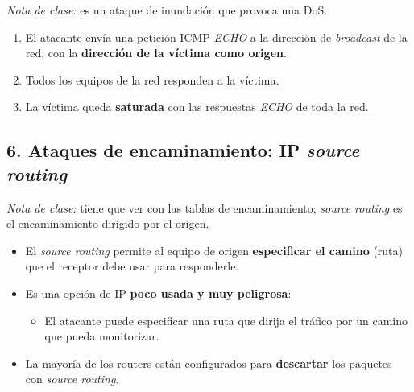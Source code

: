 \documentclass[11pt,a4paper]{report}
\begin{document}
\noindent\emph{Nota de clase:} es un ataque de inundación que provoca una DoS.
 
\begin{center}
\end{center}
 
\begin{enumerate}
  \item El atacante envía una petición ICMP \emph{ECHO} a la dirección de \emph{broadcast} de la red, con la \textbf{dirección de la víctima como origen}.
  \item Todos los equipos de la red responden a la víctima.
  \item La víctima queda \textbf{saturada} con las respuestas \emph{ECHO} de toda la red.
\end{enumerate}
 
\subsection{6. Ataques de encaminamiento: IP \emph{source routing}}
 
\noindent\emph{Nota de clase:} tiene que ver con las tablas de encaminamiento; \emph{source routing} es el encaminamiento dirigido por el origen.
 
\begin{itemize}
  \item El \emph{source routing} permite al equipo de origen \textbf{especificar el camino} (ruta) que el receptor debe usar para responderle.
  \item Es una opción de IP \textbf{poco usada y muy peligrosa}:
    \begin{itemize}
      \item El atacante puede especificar una ruta que dirija el tráfico por un camino que pueda monitorizar.
    \end{itemize}
  \item La mayoría de los routers están configurados para \textbf{descartar} los paquetes con \emph{source routing}.
\end{itemize}
 
\end{document}
